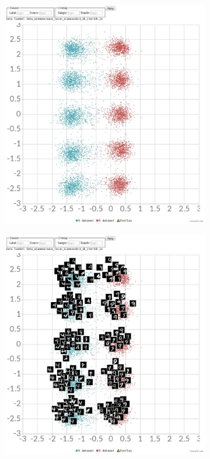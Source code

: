 \documentclass[a4paper,12pt]{report}
\begin{document}
\begin{figure}[t]
    \centering
    \begin{subfigure}[t]{0.75\textwidth}
        \centering
        \includegraphics{thesis_figures/mnist_cl2d.jpg}
    \end{subfigure}
    \begin{subfigure}[t]{0.75\textwidth}
        \centering
        \includegraphics{thesis_figures/mnist_cl2d2.jpg}

\end{subfigure}
\end{figure}
\end{document}
